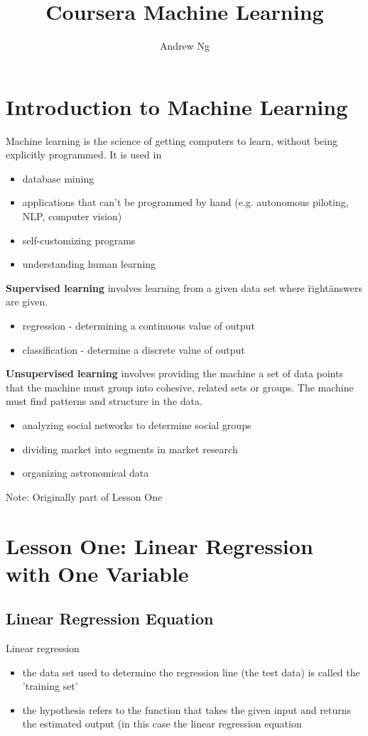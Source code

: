 \documentclass[12pt, twoside, a4paper]{book}
\begin{document}
\frontmatter
\title{Coursera Machine Learning}
\author{Andrew Ng}
\maketitle
\tableofcontents

\mainmatter
\chapter{Introduction to Machine Learning}
Machine learning is the science of getting computers to learn, without being explicitly programmed. It is used in
\begin{itemize}
\item database mining
\item applications that can't be programmed by hand (e.g. autonomous piloting, NLP, computer vision)
\item self-customizing programs
\item understanding human learning
\end{itemize}

\textbf{Supervised learning} involves learning from a given data set where \"right\" answers are given.
\begin{itemize}
\item regression - determining a continuous value of output
\item classification - determine a discrete value of output
\end{itemize}

\textbf{Unsupervised learning} involves providing the machine a set of data points that the machine must group into cohesive, related sets or groups. The machine must find patterns and structure in the data.
\begin{itemize}
\item analyzing social networks to determine social groups
\item dividing market into segments in market research
\item organizing astronomical data
\end{itemize}

Note: Originally part of Lesson One


\chapter{Lesson One: Linear Regression with One Variable}
\section{Linear Regression Equation}
Linear regression
\begin{itemize}
\item the data set used to determine the regression line (the test data) is called the 'training set'
\item the hypothesis refers to the function that takes the given input and returns the estimated output (in this case the linear regression equation
\end{itemize}
\end{document}
